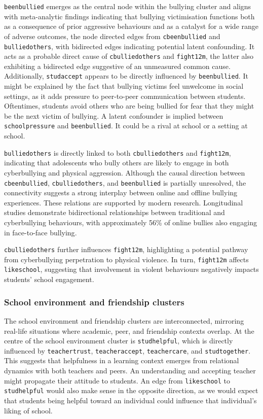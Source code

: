 \documentclass[main.tex]{subfiles}
\begin{document}
\texttt{beenbullied} emerges as the central node within the bullying cluster and aligns with meta-analytic findings indicating that bullying victimisation functions both as a consequence of prior aggressive behaviours and as a catalyst for a wide range of adverse outcomes\cite{Li2024bullying}, the node directed edges from \texttt{cbeenbullied} and \texttt{bulliedothers}, with bidirected edges indicating potential latent confounding. It acts as a probable direct cause of \texttt{cbulliedothers} and \texttt{fight12m}, the latter also exhibiting a bidirected edge suggestive of an unmeasured common cause. Additionally, \texttt{studaccept} appears to be directly influenced by \texttt{beenbullied}. It might be explained by the fact that bullying victims feel unwelcome in social settings, as it adds pressure to peer-to-peer communication between students. Oftentimes, students avoid others who are being bullied for fear that they might be the next victim of bullying. A latent confounder is implied between \texttt{schoolpressure} and \texttt{beenbullied}. It could be a rival at school or a setting at school.

\texttt{bulliedothers} is directly linked to both \texttt{cbulliedothers} and \texttt{fight12m}, indicating that adolescents who bully others are likely to engage in both cyberbullying and physical aggression. Although the causal direction between \texttt{cbeenbullied}, \texttt{cbulliedothers}, and \texttt{beenbullied} is partially unresolved, the connectivity suggests a strong interplay between online and offline bullying experiences. These relations are supported by modern research. Longitudinal studies demonstrate bidirectional relationships between traditional and cyberbullying behaviours, with approximately 56\% of online bullies also engaging in face-to-face bullying\cite{Gorzig_Machackova_2015}.

\texttt{cbulliedothers} further influences \texttt{fight12m}, highlighting a potential pathway from cyberbullying perpetration to physical violence. In turn, \texttt{fight12m} affects \texttt{likeschool}, suggesting that involvement in violent behaviours negatively impacts students' school engagement\cite{Li2024bullying}.


\subsubsection*{School environment and friendship clusters}

The school environment and friendship clusters are interconnected, mirroring real-life situations where academic, peer, and friendship contexts overlap. At the centre of the school environment cluster is \texttt{studhelpful}, which is directly influenced by \texttt{teachertrust}, \texttt{teacheraccept}, \texttt{teachercare}, and \texttt{studtogether}. This suggests that helpfulness in a learning context emerges from relational dynamics with both teachers and peers. An understanding and accepting teacher might propagate their attitude to students. An edge from \texttt{likeschool} to \texttt{studhelpful} would also make sense in the opposite direction, as we would expect that students being helpful toward an individual could influence that individual's liking of school.
\end{document}
